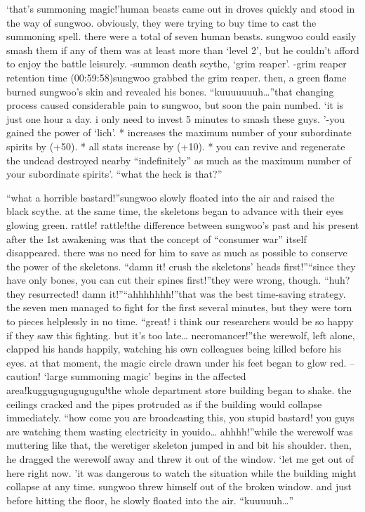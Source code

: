 ‘that’s summoning magic!’human beasts came out in droves quickly and stood in the way of sungwoo.
 obviously, they were trying to buy time to cast the summoning spell.
there were a total of seven human beasts.
 sungwoo could easily smash them if any of them was at least more than ‘level 2’, but he couldn’t afford to enjoy the battle leisurely.
-summon death scythe, ‘grim reaper’.
-grim reaper retention time (00:59:58)sungwoo grabbed the grim reaper.
 then, a green flame burned sungwoo’s skin and revealed his bones.
“kuuuuuuuh…”that changing process caused considerable pain to sungwoo, but soon the pain numbed.
‘it is just one hour a day.
 i only need to invest 5 minutes to smash these guys.
’-you gained the power of ‘lich’.
* increases the maximum number of your subordinate spirits by (+50).
* all stats increase by (+10).
* you can revive and regenerate the undead destroyed nearby “indefinitely” as much as the maximum number of your subordinate spirits’.
“what the heck is that?”

“what a horrible bastard!”sungwoo slowly floated into the air and raised the black scythe.
 at the same time, the skeletons began to advance with their eyes glowing green.
rattle! rattle!the difference between sungwoo’s past and his present after the 1st awakening was that the concept of “consumer war” itself disappeared.
 there was no need for him to save as much as possible to conserve the power of the skeletons.
“damn it! crush the skeletons’ heads first!”“since they have only bones, you can cut their spines first!”they were wrong, though.
“huh? they resurrected! damn it!”“ahhhhhhh!”that was the best time-saving strategy.
 the seven men managed to fight for the first several minutes, but they were torn to pieces helplessly in no time.
“great! i think our researchers would be so happy if they saw this fighting.
 but it’s too late… necromancer!”the werewolf, left alone, clapped his hands happily, watching his own colleagues being killed before his eyes.
at that moment, the magic circle drawn under his feet began to glow red.
– caution! ‘large summoning magic’ begins in the affected area!kuggugugugugugu!the whole department store building began to shake.
 the ceilings cracked and the pipes protruded as if the building would collapse immediately.
“how come you are broadcasting this, you stupid bastard! you guys are watching them wasting electricity in youido… ahhhh!”while the werewolf was muttering like that, the weretiger skeleton jumped in and bit his shoulder.
 then, he dragged the werewolf away and threw it out of the window.
‘let me get out of here right now.
’it was dangerous to watch the situation while the building might collapse at any time.
sungwoo threw himself out of the broken window.
 and just before hitting the floor, he slowly floated into the air.
“kuuuuuh…”

 